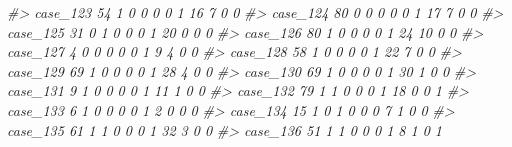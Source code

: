 \documentclass[]{book}
\newenvironment{Shaded}{\begin{snugshade}}{\end{snugshade}}
\newcommand{\CommentTok}[1]{\textcolor[rgb]{0.56,0.35,0.01}{\textit{#1}}}
\begin{document}
\begin{Shaded}
\begin{Highlighting}[]
\CommentTok{#> case_123  54        1        0                0                 0                 0              1                    16                      7           0             0}
\CommentTok{#> case_124  80        0        0                0                 0                 0              1                    17                      7           0             0}
\CommentTok{#> case_125  31        0        1                0                 0                 0              1                    20                      0           0             0}
\CommentTok{#> case_126  80        1        0                0                 0                 0              1                    24                     10           0             0}
\CommentTok{#> case_127   4        0        0                0                 0                 0              1                     9                      4           0             0}
\CommentTok{#> case_128  58        1        0                0                 0                 0              1                    22                      7           0             0}
\CommentTok{#> case_129  69        1        0                0                 0                 0              1                    28                      4           0             0}
\CommentTok{#> case_130  69        1        0                0                 0                 0              1                    30                      1           0             0}
\CommentTok{#> case_131   9        1        0                0                 0                 0              1                    11                      1           0             0}
\CommentTok{#> case_132  79        1        1                0                 0                 0              1                    18                      0           0             1}
\CommentTok{#> case_133   6        1        0                0                 0                 0              1                     2                      0           0             0}
\CommentTok{#> case_134  15        1        0                1                 0                 0              0                     7                      1           0             0}
\CommentTok{#> case_135  61        1        1                0                 0                 0              1                    32                      3           0             0}
\CommentTok{#> case_136  51        1        1                0                 0                 0              1                     8                      1           0             1}
\end{Highlighting}
\end{Shaded}
\end{document}
